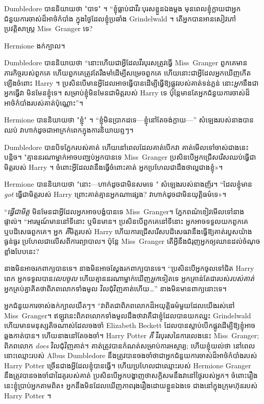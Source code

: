 {{Dumbledore បាននិយាយថា "បាទ" ។ “ខ្ញុំធ្លាប់ជាវីរៈបុរសខ្លួនឯងម្តង មុនពេលខ្ញុំក្លាយជាអ្នកជំនួយការចាស់ដ៏អាថ៌កំបាំង ក្នុងថ្ងៃដែលខ្ញុំប្រឆាំង Grindelwald ។ តើអ្នកបានអានសៀវភៅប្រវត្តិសាស្ត្រ Miss~Granger ទេ?

Hermione ងក់ក្បាល។

Dumbledore បាននិយាយថា “នោះហើយជាអ្វីដែលវីរបុរសត្រូវធ្វើ Miss~Granger ពួកគេមានភារកិច្ចរបស់ពួកគេ ហើយពួកគេត្រូវតែរឹងមាំដើម្បីសម្រេចពួកគេ ហើយនោះជាអ្វីដែលអ្នកឃើញកើតឡើងចំពោះ Harry ។ ប្រសិនបើមានអ្វីដែលអាចធ្វើបានដើម្បីធ្វើឱ្យផ្លូវរបស់គាត់ទន់ភ្លន់ នោះ\emph{អ្នក}នឹងជាអ្នកធ្វើវា មិនមែនខ្ញុំទេ\@។ សម្រាប់ខ្ញុំមិនមែនជាមិត្តរបស់ Harry ទេ ប៉ុន្តែមានតែអ្នកជំនួយការចាស់ដ៏អាថ៌កំបាំងរបស់គាត់ប៉ុណ្ណោះ”។

Hermione បាននិយាយថា "ខ្ញុំ" ។ “ខ្ញុំ​មិន​ប្រាកដ​ទេ—ខ្ញុំ​នៅ​តែ​ចង់​ក្លាយ—” សំឡេង​របស់​នាង​បាន​ឈប់ វា​ហាក់​ដូច​ជា​អាក្រក់​ពេក​ក្នុង​ការ​និយាយ​ឮៗ។

Dumbledore បានបិទភ្នែករបស់គាត់ ហើយនៅពេលដែលគាត់បើកវា គាត់មើលទៅចាស់ជាងនេះបន្តិច។ "គ្មាននរណាម្នាក់អាចបញ្ឈប់អ្នកបានទេ Miss~Granger ប្រសិនបើអ្នកជ្រើសរើសឈប់ធ្វើជាមិត្តរបស់ Harry ។ ចំពោះ​អ្វី​ដែល​វា​នឹង​ធ្វើ​ចំពោះ​គាត់ អ្នក​ប្រហែល​ជា​ដឹង​ថា​ល្អ​ជាង​ខ្ញុំ»។

Hermione បាននិយាយថា "នោះ—ហាក់ដូចជាមិនសមទេ \emph{}" សំឡេងរបស់នាងញ័រ។ “ដែលខ្ញុំមាន \emph{got} ធ្វើជាមិត្តរបស់ Harry ព្រោះគាត់គ្មានអ្នកណាផ្សេង? វា​ហាក់​ដូចជា​មិន​យុត្តិធម៌​ទេ»។

“\emph{ធ្វើជាមិត្ត} មិនមែនជាអ្វីដែលអ្នកអាចបង្ខំបានទេ Miss~Granger។ ភ្នែកពណ៌ខៀវមើលទៅនាងផ្ទាល់។ “អារម្មណ៍​មាន​នៅ​ទី​នោះ ឬ​មិន​មាន។ ប្រសិនបើពួកគេនៅទីនោះ អ្នកអាចទទួលយកពួកគេ ឬបដិសេធពួកគេ។ អ្នក \emph{គឺ}មិត្តរបស់ Harry ហើយការជ្រើសរើសបដិសេធវានឹងធ្វើឱ្យគាត់របួសយ៉ាងធ្ងន់ធ្ងរ ប្រហែលជាលើសពីការព្យាបាល។ ប៉ុន្តែ Miss~Granger តើ​អ្វី​នឹង​ជំរុញ​អ្នក​ឲ្យ​ឈាន​ដល់​ចំណុច​ខ្លាំង​បែប​នេះ?

នាងមិនអាចរកពាក្យបានទេ។ នាងមិនអាចស្វែងរកពាក្យបានទេ។ “ប្រសិនបើអ្នកចូលទៅជិត Harry ពេក អ្នកទទួលបាន\emph{លេបចូល} ហើយគ្មាននរណាម្នាក់ឃើញ\emph{អ្នក}ទៀតទេ អ្នកគ្រាន់តែជារបស់\emph{របស់គាត់} អ្នកគ្រប់គ្នាគិតថាពិភពលោកទាំងមូល វិលជុំវិញគាត់ហើយ…” នាងមិនមានពាក្យនោះទេ។

អ្នកជំនួយការចាស់ងក់ក្បាលយឺតៗ។ “វាពិតជាពិភពលោកដ៏អយុត្តិធម៌មួយដែលយើងរស់នៅ Miss~Granger។ ឥឡូវនេះពិភពលោកទាំងមូលដឹងថាវាគឺជាខ្ញុំដែលបានយកឈ្នះ Grindelwald ហើយមានមនុស្សតិចណាស់ដែលចងចាំ Elizabeth Beckett ដែលបានស្លាប់បើកផ្លូវដើម្បីឱ្យខ្ញុំអាចឆ្លងកាត់បាន។ ហើយនាងនៅតែចងចាំ។ Harry Potter \emph{គឺ} វីរបុរសនៃការលេងនេះ Miss~Granger; ពិភពលោក \emph{does} វិលជុំវិញគាត់។ គាត់​ត្រូវ​បាន​កំណត់​សម្រាប់​ការ​អស្ចារ្យ; ហើយខ្ញុំយល់ថា នៅពេលនោះឈ្មោះរបស់ Albus Dumbledore នឹងត្រូវបានចងចាំថាជាអ្នកជំនួយការចាស់ដ៏អាថ៌កំបាំងរបស់ Harry Potter ច្រើនជាងអ្វីដែលខ្ញុំបានធ្វើ។ ហើយប្រហែលជាឈ្មោះរបស់ Hermione Granger នឹងត្រូវបានចងចាំជាដៃគូរបស់គាត់ ប្រសិនបើអ្នកបង្ហាញថាសក្ដិសមនឹងវានៅថ្ងៃរបស់អ្នក។ ចំពោះរឿងនេះខ្ញុំប្រាប់អ្នកតាមពិត៖ អ្នកនឹងមិនដែលឃើញភាពរុងរឿងដោយខ្លួនឯងទេ ជាងនៅក្នុងក្រុមហ៊ុនរបស់ Harry Potter ។

}}
